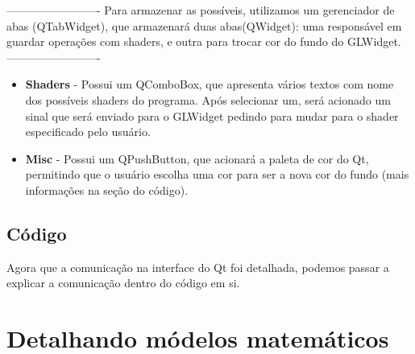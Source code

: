 \documentclass{ol-softwaremanual}
\begin{document}
-------------------------
Para armazenar as possíveis, utilizamos um gerenciador 
de abas (QTabWidget), que armazenará duas abas(QWidget): uma 
responsável em guardar operações com shaders, e outra 
para trocar cor do fundo do GLWidget.
-------------------------

\begin{itemize}
    \item \textbf{Shaders} - Possui um QComboBox, que apresenta 
    vários textos com nome dos possíveis shaders do 
    programa. Após selecionar um, será acionado um sinal 
    que será enviado para o GLWidget pedindo para mudar 
    para o shader especificado pelo usuário.
    \item \textbf{Misc} - Possui um QPushButton, que acionará a 
    paleta de cor do Qt, permitindo que o usuário escolha 
    uma cor para ser a nova cor do fundo (mais informações 
    na seção do código).
\end{itemize}

\subsection{Código}

Agora que a comunicação na interface do Qt foi detalhada,
podemos passar a explicar a comunicação dentro do código em si.




\section{Detalhando módelos matemáticos}
\end{document}
